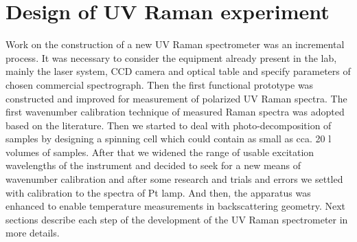 \section{Design of UV Raman experiment}

Work on the construction of a new UV Raman spectrometer was an incremental
process. It was necessary to consider the equipment already present in the lab,
mainly the laser system, CCD camera and optical table and specify parameters of
chosen commercial spectrograph. Then the first functional prototype was
constructed and improved for measurement of polarized UV Raman spectra. The
first wavenumber calibration technique of measured Raman spectra
was adopted based on the literature. Then we started to deal with
photo-decomposition of samples by designing a spinning cell which could contain
as small as cca. 20 l volumes of samples. After that we widened the range
of usable excitation wavelengths of the instrument and decided to seek for a
new means of wavenumber calibration and after some research and trials and
errors we settled with calibration to the spectra of Pt lamp. And then, the
apparatus was enhanced to enable temperature measurements in backscattering
geometry. Next sections describe each step of the development of the UV Raman
spectrometer in more details.











